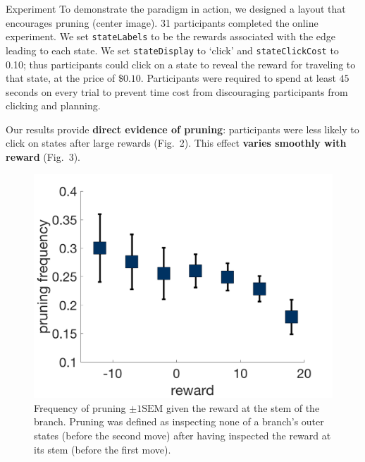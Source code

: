 \documentclass[final]{beamer}
\newlength{\onecolwid}
\begin{document}
\begin{frame}[t, fragile]
\begin{columns}[t]
\begin{column}{\onecolwid}
  \begin{block}{Experiment}\label{experiment}
  To demonstrate the paradigm in action, we designed a layout that encourages pruning (center image). 31 participants completed the online experiment. We set \texttt{stateLabels} to be the rewards associated with the edge leading to each state. We set \texttt{stateDisplay} to `click' and \texttt{stateClickCost} to 0.10; thus participants could click on a state to reveal the reward for traveling to that state, at the price of $\$0.10$. Participants were required to spend at least $45$ seconds on every trial to prevent time cost from discouraging participants from clicking and planning.

  Our results provide \textbf{direct evidence of pruning}: participants were less likely to click on states after large rewards (Fig.~2). This effect \textbf{varies smoothly with reward} (Fig.~3).

  \end{block}


  \begin{figure}
    \label{fig:pruning}
    \includegraphics[width=0.9\linewidth]{figs/prunning_any_noFB.png}
    \captionsetup{width=0.9\linewidth}
    \caption[first]{Frequency of pruning $\pm 1 \text{SEM}$ given the reward at the stem of the branch. Pruning was defined as inspecting none of a branch's outer states (before the second move) after having inspected the reward at its stem (before the first move).}
  \end{figure}


\end{column}
\end{columns}
\end{frame}
\end{document}
